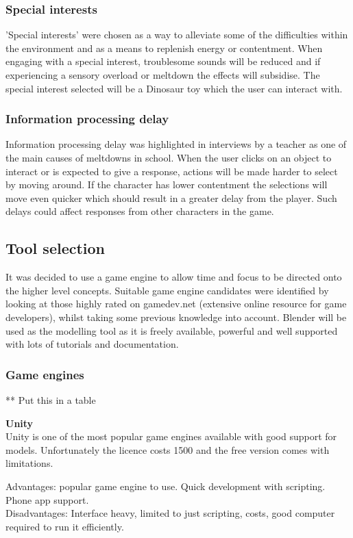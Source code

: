 \documentclass[11pt]{report}
\begin{document}
\subsubsection{Special interests}
'Special interests' were chosen as a way to alleviate some of the difficulties within the environment and as a means to replenish energy or contentment. When engaging with a special interest, troublesome sounds will be reduced and if experiencing a sensory overload or meltdown the effects will subsidise. The special interest selected will be a Dinosaur toy which the user can interact with.

\subsubsection{Information processing delay}
Information processing delay was highlighted in interviews by a teacher as one of the main causes of meltdowns in school. When the user clicks on an object to interact or is expected to give a response, actions will be made harder to select by moving around. If the character has lower contentment the selections will move even quicker which should result in a greater delay from the player. Such delays could affect responses from other characters in the game. 

\subsection{Tool selection}
It was decided to use a game engine to allow time and focus to be directed onto the higher level concepts. Suitable game engine candidates were identified by looking at those highly rated on gamedev.net (extensive online resource for game developers), whilst taking some previous knowledge into account. Blender will be used as the modelling tool as it is freely available, powerful and well supported with lots of tutorials and documentation.

\subsubsection{Game engines}

** Put this in a table

\textbf{Unity}\\
Unity is one of the most popular game engines available with good support for models. Unfortunately the licence costs 1500 and the free version comes with limitations.

Advantages: popular game engine to use. Quick development with scripting. Phone app support.\\
Disadvantages: Interface heavy, limited to just scripting, costs, good computer required to run it efficiently.
\end{document}
